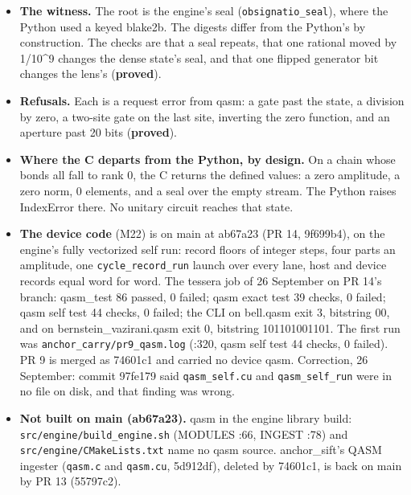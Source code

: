 \begin{itemize}
\begin{itemize}
\item A machine count on the Python model: at round 16, every vanished curvature sample on both strands came from a degenerate draw (a = 0, b = 0 or a = b), 30 forward and 14 backward. None of the 370 forward and 386 backward non-degenerate draws vanished. At this aperture the curvature column counts degenerate draws, and the field shows no flat direction (\textbf{measured}).
\end{itemize}
\item \textbf{The witness.} The root is the engine's seal (\texttt{obsignatio\_\allowbreak{}seal}), where the Python used a keyed blake2b. The digests differ from the Python's by construction. The checks are that a seal repeats, that one rational moved by 1/10\textasciicircum{}9 changes the dense state's seal, and that one flipped generator bit changes the lens's (\textbf{proved}).
\item \textbf{Refusals.} Each is a request error from qasm: a gate past the state, a division by zero, a two-site gate on the last site, inverting the zero function, and an aperture past 20 bits (\textbf{proved}).
\item \textbf{Where the C departs from the Python, by design.} On a chain whose bonds all fall to rank 0, the C returns the defined values: a zero amplitude, a zero norm, 0 elements, and a seal over the empty stream. The Python raises IndexError there. No unitary circuit reaches that state.
\item \textbf{The device code} (M22) is on main at ab67a23 (PR 14, 9f699b4), on the engine's fully vectorized self run: record floors of integer steps, four parts an amplitude, one \texttt{cycle\_\allowbreak{}record\_\allowbreak{}run} launch over every lane, host and device records equal word for word. The tessera job of 26 September on PR 14's branch: qasm\_\allowbreak{}test 86 passed, 0 failed; qasm exact test 39 checks, 0 failed; qasm self test 44 checks, 0 failed; the CLI on bell.qasm exit 3, bitstring 00, and on bernstein\_\allowbreak{}vazirani.qasm exit 0, bitstring 101101001101. The first run was \texttt{anchor\_\allowbreak{}carry/\allowbreak{}pr9\_\allowbreak{}qasm.\allowbreak{}log} (:320, qasm self test 44 checks, 0 failed). PR 9 is merged as 74601c1 and carried no device qasm. Correction, 26 September: commit 97fe179 said \texttt{qasm\_\allowbreak{}self.\allowbreak{}cu} and \texttt{qasm\_\allowbreak{}self\_\allowbreak{}run} were in no file on disk, and that finding was wrong.
\item \textbf{Not built on main (ab67a23).} qasm in the engine library build: \texttt{src/\allowbreak{}engine/\allowbreak{}build\_\allowbreak{}engine.\allowbreak{}sh} (MODULES :66, INGEST :78) and \texttt{src/\allowbreak{}engine/\allowbreak{}CMake\allowbreak{}Lists.\allowbreak{}txt} name no qasm source. anchor\_\allowbreak{}sift's QASM ingester (\texttt{qasm.\allowbreak{}c} and \texttt{qasm.\allowbreak{}cu}, 5d912df), deleted by 74601c1, is back on main by PR 13 (55797c2).
\end{itemize}

